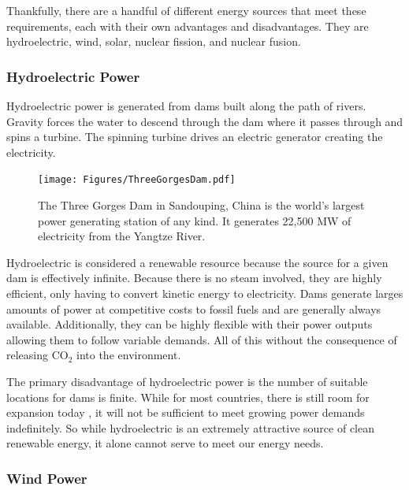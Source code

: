 	Thankfully, there are a handful of different energy sources that meet these requirements, each with their own advantages and disadvantages. They are hydroelectric, wind, solar, nuclear fission, and nuclear fusion. 
	
	\subsubsection{Hydroelectric Power}
	
		Hydroelectric power is generated from dams built along the path of rivers. Gravity forces the water to descend through the dam where it passes through and spins a turbine. The spinning turbine drives an electric generator creating the electricity.
		
		\begin{figure}[h!]
			\centering
			\texttt{[image: Figures/ThreeGorgesDam.pdf]}
			\caption[Three Gorges Dam]{The Three Gorges Dam in Sandouping, China is the world's largest power generating station of any kind. It generates 22,500 MW of electricity from the Yangtze River. \cite{cleveland_handbook_2014, ehrlich_renewable_2014, Image_ThreeGorgesDam}}
		\end{figure}
	
		Hydroelectric is considered a renewable resource because the source for a given dam is effectively infinite. Because there is no steam involved, they are highly efficient, only having to convert kinetic energy to electricity. \cite{freidberg_plasma_2007} Dams generate larges amounts of power at competitive costs to fossil fuels \cite{eia_lcoe_2020} and are generally always available. \cite{bibid} Additionally, they can be highly flexible with their power outputs allowing them to follow variable demands. \cite{huggins_energy_2010} All of this without the consequence of releasing CO$_2$ into the environment. \cite{bickel_externe:_2005}
		
		The primary disadvantage of hydroelectric power is the number of suitable locations for dams is finite. While for most countries, there is still room for expansion today \cite{iea_hydro, freidberg_plasma_2007}, it will not be sufficient to meet growing power demands indefinitely. So while hydroelectric is an extremely attractive source of clean renewable energy, it alone cannot serve to meet our energy needs.
		
	
	\subsubsection{Wind Power}
	
